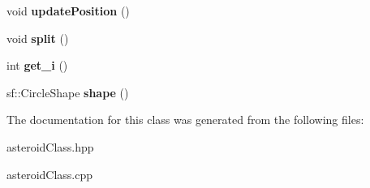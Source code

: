 \begin{DoxyCompactItemize}
\item 
\mbox{\label{class_asteroid_a2ab7a34c9bd7b78052b2bd5b956f8b44}} 
void {\bfseries update\+Position} ()
\item 
\mbox{\label{class_asteroid_a46dddcabfbc1ddde37d914aca02ef0e3}} 
void {\bfseries split} ()
\item 
\mbox{\label{class_asteroid_a859b10a0e607403d003649b64714e9ae}} 
int {\bfseries get\+\_\+i} ()
\item 
\mbox{\label{class_asteroid_a934b3993cd32a2cb3f13e9541bc5d6b8}} 
sf\+::\+Circle\+Shape {\bfseries shape} ()
\end{DoxyCompactItemize}


The documentation for this class was generated from the following files\+:\begin{DoxyCompactItemize}
\item 
asteroid\+Class.\+hpp\item 
asteroid\+Class.\+cpp\end{DoxyCompactItemize}
